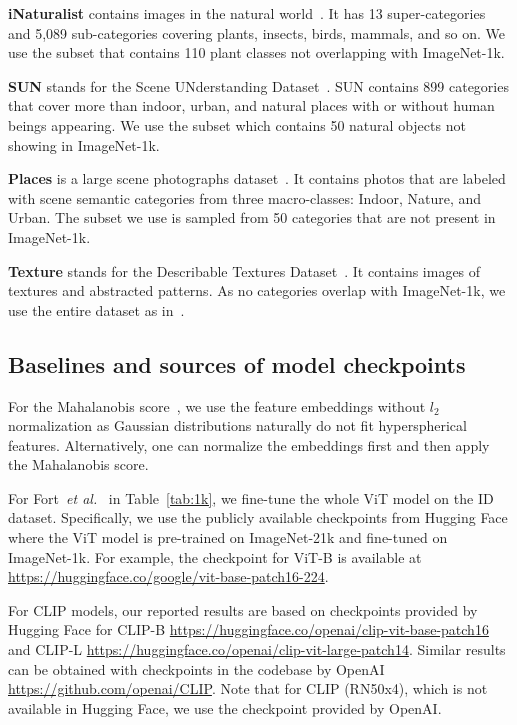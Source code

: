 \documentclass{article}
\def\etal{\emph{et al.}}
\begin{document}
\textbf{iNaturalist} contains images in the natural world~\cite{van2018inaturalist}. It has 13 super-categories and 5,089 sub-categories covering plants, insects, birds, mammals, and so on. We use the subset that contains 110 plant classes not overlapping with ImageNet-1k.

\textbf{SUN} stands for the Scene UNderstanding Dataset~\cite{xiao2010sun}. SUN contains 899 categories that cover more than indoor, urban, and natural places with or without human beings appearing. We use the subset which contains 50 natural objects not showing in ImageNet-1k.

\textbf{Places} is a large scene photographs dataset~\cite{zhou2017places}. It contains photos that are labeled with scene semantic categories from three macro-classes: Indoor, Nature, and Urban. The subset we use is sampled from 50 categories that are not present in ImageNet-1k.

\textbf{Texture} stands for the Describable Textures Dataset~\cite{cimpoi2014describing}. It contains images of textures and abstracted patterns. As no categories overlap with ImageNet-1k, we use the entire dataset as in~\cite{huang2021mos}.
\subsection{Baselines and sources of model checkpoints}
For the Mahalanobis score~\cite{lee2018simple}, we use the feature embeddings without $l_2$ normalization as Gaussian distributions naturally do not fit hyperspherical features. Alternatively, one can normalize the embeddings first and then apply the Mahalanobis score. 

For Fort~\etal~\cite{fort2021exploring} in Table~\ref{tab:1k}, we fine-tune the whole ViT model on the ID dataset. Specifically, we use the publicly available checkpoints from Hugging Face where the ViT model is pre-trained on ImageNet-21k and fine-tuned on ImageNet-1k. For example, the checkpoint for ViT-B is available at \url{https://huggingface.co/google/vit-base-patch16-224}. 

For CLIP models, our reported results are based on checkpoints provided by Hugging Face for CLIP-B \url{https://huggingface.co/openai/clip-vit-base-patch16} and CLIP-L \url{https://huggingface.co/openai/clip-vit-large-patch14}. Similar results can be obtained with checkpoints in the codebase by OpenAI \url{https://github.com/openai/CLIP}. Note that for CLIP (RN50x4), which is not available in Hugging Face, we use the checkpoint provided by OpenAI. 
\end{document}
